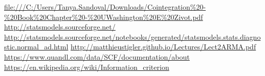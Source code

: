 \documentclass[11pt]{article}
\begin{document}
\begin{thebibliography}{1}
 \href{file:///C:/Users/Tanya.Sandoval/Downloads/Cointegration\%20-\%20Book\%20Chapter\%20-\%20UWashington\%20E\%20Zivot.pdf}{file:///C:/Users/Tanya.Sandoval/Downloads/Cointegration\%20-\%20Book\%20Chapter\%20-\%20UWashington\%20E\%20Zivot.pdf}
 \href{http://statsmodels.sourceforge.net/}{http://statsmodels.sourceforge.net/}
 \href{http://statsmodels.sourceforge.net/notebooks/generated/statsmodels.stats.diagnostic.normal\_ad.html}{http://statsmodels.sourceforge.net/notebooks/generated/statsmodels.stats.diagnostic.normal\_ad.html}
 \href{http://matthieustigler.github.io/Lectures/Lect2ARMA.pdf}{http://matthieustigler.github.io/Lectures/Lect2ARMA.pdf}
 \href{https://www.quandl.com/data/SCF/documentation/about}{https://www.quandl.com/data/SCF/documentation/about}
 \href{https://en.wikipedia.org/wiki/Information\_criterion}{https://en.wikipedia.org/wiki/Information\_criterion}
\end{thebibliography}


    
    
\end{document}
